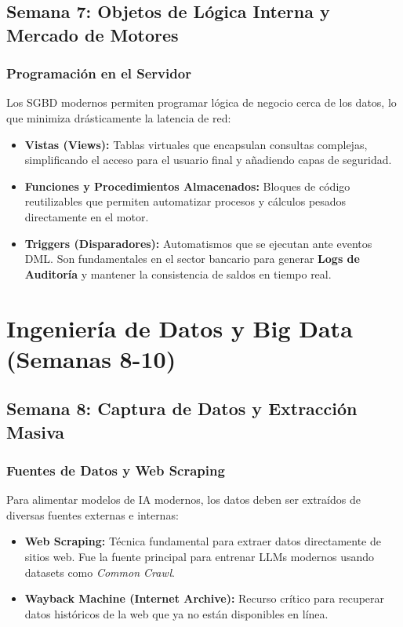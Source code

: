 \documentclass[12pt,a4paper,openany,oneside]{book}
\begin{document}
\section{Semana 7: Objetos de Lógica Interna y Mercado de Motores}

\subsection{Programación en el Servidor}
Los SGBD modernos permiten programar lógica de negocio cerca de los datos, lo que minimiza drásticamente la latencia de red:
\begin{itemize}
    \item \textbf{Vistas (Views):} Tablas virtuales que encapsulan consultas complejas, simplificando el acceso para el usuario final y añadiendo capas de seguridad.
    \item \textbf{Funciones y Procedimientos Almacenados:} Bloques de código reutilizables que permiten automatizar procesos y cálculos pesados directamente en el motor.
    \item \textbf{Triggers (Disparadores):} Automatismos que se ejecutan ante eventos DML. Son fundamentales en el sector bancario para generar \textbf{Logs de Auditoría} y mantener la consistencia de saldos en tiempo real.
\end{itemize}
















\chapter{Ingeniería de Datos y Big Data (Semanas 8-10)}

\section{Semana 8: Captura de Datos y Extracción Masiva}

\subsection{Fuentes de Datos y Web Scraping}
Para alimentar modelos de IA modernos, los datos deben ser extraídos de diversas fuentes externas e internas:
\begin{itemize}
    \item \textbf{Web Scraping:} Técnica fundamental para extraer datos directamente de sitios web. Fue la fuente principal para entrenar LLMs modernos usando datasets como \textit{Common Crawl}.
    \item \textbf{Wayback Machine (Internet Archive):} Recurso crítico para recuperar datos históricos de la web que ya no están disponibles en línea.
\end{itemize}
\end{document}
